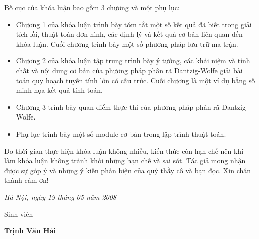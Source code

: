 Bố cục của khóa luận bao gồm 3 chương và một phụ lục:
\begin{itemize}
\item  Chương 1 của khóa luận trình bày tóm tắt một số kết quả đã biết trong giải tích lồi, thuật toán đơn hình, các định lý và kết quả cơ bản liên quan đến khóa luận. Cuối chương trình bày một số phương pháp lưu trữ ma trận.
\item  Chương 2 của khóa luận tập trung trình bày ý tưởng, các khái niệm và tính chất và nội dung cơ bản của phương pháp phân rã Dantzig-Wolfe giải bài toán quy hoạch tuyến tính lớn có cấu trúc. Cuối chương là một ví dụ bằng số minh họa kết quả tính toán.
\item Chương 3 trình bày quan điểm thực thi của phương pháp phân rã Dantzig-Wolfe.
\item Phụ lục trình bày một số module cơ bản trong lập trình thuật toán.
\end{itemize}
Do thời gian thực hiện khóa luận không nhiều, kiến thức còn hạn chế nên khi làm khóa luận không tránh khỏi những hạn chế và sai sót. Tác giả mong  nhận được sự góp ý và những ý kiến phản biện của quý thầy cô và bạn đọc.
\textrm{Xin chân thành cảm ơn!}
  \begin{flushright}
{\it Hà Nội, ngày 19 tháng 05 năm 2008}

 Sinh viên \hskip 2cm\quad

\vskip 2cm
{\bf Trịnh Văn Hải} \hskip 1cm \quad\ 
 \end{flushright}



